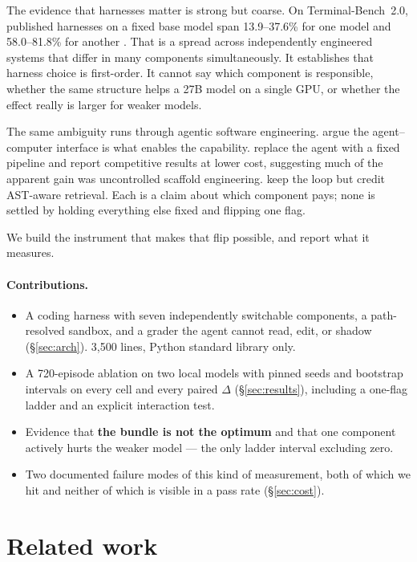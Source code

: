 \documentclass[10pt]{article}
\begin{document}
The evidence that harnesses matter is strong but coarse. On Terminal-Bench~2.0, published
harnesses on a fixed base model span 13.9--37.6\% for one model and 58.0--81.8\% for another
\citep[Table 7]{metaharness}. That is a spread across independently engineered systems that
differ in many components simultaneously. It establishes that harness choice is first-order.
It cannot say which component is responsible, whether the same structure helps a 27B model on
a single GPU, or whether the effect really is larger for weaker models.

The same ambiguity runs through agentic software engineering. \citet{sweagent} argue the
agent--computer interface is what enables the capability. \citet{agentless} replace the agent
with a fixed pipeline and report competitive results at lower cost, suggesting much of the
apparent gain was uncontrolled scaffold engineering. \citet{autocoderover} keep the loop but
credit AST-aware retrieval. Each is a claim about which component pays; none is settled by
holding everything else fixed and flipping one flag.

We build the instrument that makes that flip possible, and report what it measures.

\paragraph{Contributions.}
\begin{itemize}\itemsep2pt
\item A coding harness with seven independently switchable components, a path-resolved
sandbox, and a grader the agent cannot read, edit, or shadow (\S\ref{sec:arch}). 3{,}500 lines,
Python standard library only.
\item A 720-episode ablation on two local models with pinned seeds and bootstrap intervals on
every cell and every paired $\Delta$ (\S\ref{sec:results}), including a one-flag ladder and an
explicit interaction test.
\item Evidence that \textbf{the bundle is not the optimum} and that one component actively
hurts the weaker model --- the only ladder interval excluding zero.
\item Two documented failure modes of this kind of measurement, both of which we hit and
neither of which is visible in a pass rate (\S\ref{sec:cost}).
\end{itemize}

\section{Related work}
\end{document}
